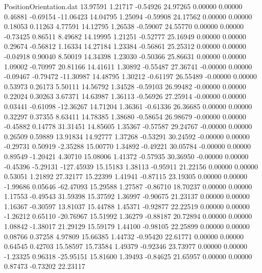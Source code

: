 \begin{filecontents}{PositionOrientation.dat}
  13.97591    1.21717   -0.54926    24.97265    0.00000    0.00000    0.46881   -0.69154  -11.06423
  14.04795    1.25094   -0.59908    24.17562    0.00000    0.00000    0.18053    0.11263    4.77591
  14.12795    1.26538   -0.59007    24.55770    0.00000    0.00000   -0.73425    0.86511    8.49682
  14.19995    1.21251   -0.52777    25.16949    0.00000    0.00000    0.29674   -0.56812    1.16334
  14.27184    1.23384   -0.56861    25.25312    0.00000    0.00000   -0.04918    0.90040    8.50019
  14.34398    1.23030   -0.50366    25.86631    0.00000    0.00000    1.09002   -0.70997   20.81166
  14.41611    1.30892   -0.55487    27.36741   -0.00000    0.00000   -0.09467   -0.79472  -11.30987
  14.48795    1.30212   -0.61197    26.55489   -0.00000    0.00000    0.53973    0.26173    5.50111
  14.56792    1.34528   -0.59103    26.99482   -0.00000    0.00000    0.22024    0.30263    3.67371
  14.63987    1.36113   -0.56926    27.25914   -0.00000    0.00000    0.03441   -0.61098  -12.36267
  14.71204    1.36361   -0.61336    26.36685    0.00000    0.00000    0.32297    0.37355    8.63411
  14.78385    1.38680   -0.58654    26.98679   -0.00000    0.00000   -0.45882    0.14778   31.31451
  14.85605    1.35367   -0.57587    29.24767   -0.00000    0.00000    0.26509    0.59889   13.91834
  14.92777    1.37268   -0.53291    30.24592   -0.00000    0.00000   -0.29731    0.50919   -2.35288
  15.00770    1.34892   -0.49221    30.05784   -0.00000    0.00000    0.89549   -1.20421    4.30710
  15.08006    1.41372   -0.57935    30.36950   -0.00000    0.00000   -0.45396   -5.29131 -127.45939
  15.15183    1.38113   -0.95911    21.22156    0.00000    0.00000    0.53051    1.21892   27.32177
  15.22399    1.41941   -0.87115    23.19305    0.00000    0.00000   -1.99686    0.05646  -62.47093
  15.29588    1.27587   -0.86710    18.70237    0.00000    0.00000    1.17553   -0.49543   31.59398
  15.37592    1.36997   -0.90675    21.23137    0.00000    0.00000    1.16367   -0.30597   13.81037
  15.44788    1.45371   -0.92877    22.22519    0.00000    0.00000   -1.26212    0.65110  -20.76967
  15.51992    1.36279   -0.88187    20.72894    0.00000    0.00000    1.08842   -1.38017   21.29129
  15.59179    1.44100   -0.98105    22.25899    0.00000    0.00000    0.08766    0.37258    4.97809
  15.66385    1.44732   -0.95420    22.61771    0.00000    0.00000    0.64545    0.42703   15.58597
  15.73584    1.49379   -0.92346    23.73977    0.00000    0.00000   -1.23325    0.96318  -25.95151
  15.81600    1.39493   -0.84625    21.65957    0.00000    0.00000    0.87473   -0.73202   22.23117

\end{filecontents}
